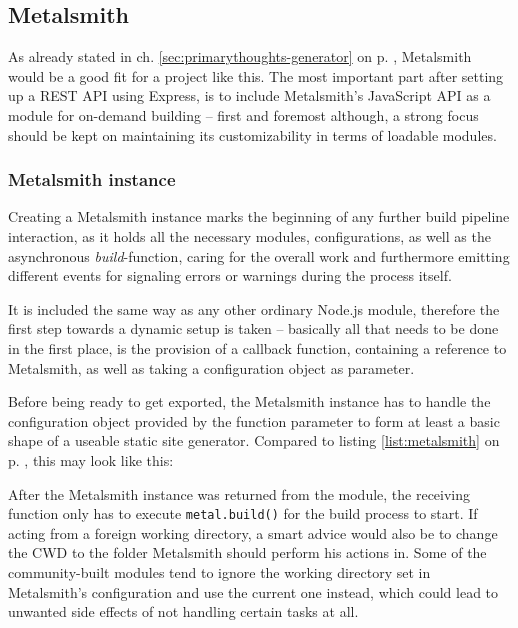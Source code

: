 \subsection{Metalsmith}
\label{sec:foundation-metalsmith}

As already stated in ch. \ref{sec:primarythoughts-generator} on p. \pageref{sec:primarythoughts-generator}, Metalsmith would be a good fit for a project like this. The most important part after setting up a REST API using Express, is to include Metalsmith's JavaScript API as a module for on-demand building -- first and foremost although, a strong focus should be kept on maintaining its customizability in terms of loadable modules.

\subsubsection{Metalsmith instance}
Creating a Metalsmith instance marks the beginning of any further build pipeline interaction, as it holds all the necessary modules, configurations, as well as the asynchronous \emph{build}-function, caring for the overall work and furthermore emitting different events for signaling errors or warnings during the process itself.

It is included the same way as any other ordinary Node.js module, therefore the first step towards a dynamic setup is taken -- basically all that needs to be done in the first place, is the provision of a callback function, containing a reference to Metalsmith, as well as taking a configuration object as parameter.

Before being ready to get exported, the Metalsmith instance has to handle the configuration object provided by the function parameter to form at least a basic shape of a useable static site generator. Compared to listing \ref{list:metalsmith} on p. \pageref{list:metalsmith}, this may look like this:



After the Metalsmith instance was returned from the module, the receiving function only has to execute \texttt{metal.build()} for the build process to start. If acting from a foreign working directory, a smart advice would also be to change the CWD to the folder Metalsmith should perform his actions in. Some of the community-built modules tend to ignore the working directory set in Metalsmith's configuration and use the current one instead, which could lead to unwanted side effects of not handling certain tasks at all.

